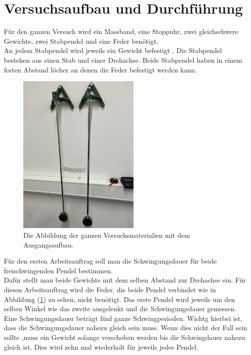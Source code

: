 \section{Versuchsaufbau und Durchführung}

\begin{flushleft}
    Für den ganzen Versuch wird ein Massband, eine Stoppuhr, zwei gleichschwere Gewichte, zwei Stabpendel und eine Feder benötigt.\\
    An jedem Stabpendel wird jeweils ein Gewicht befestigt . 
    Die Stabpendel bestehen aus einen Stab und einer Drehachse. 
    Beide Stabpendel haben in einem festen Abstand  löcher an denen die Feder befestigt werden kann.
\end{flushleft}

\begin{figure}
    \centering
    \includegraphics[height=80mm]{bilder/aufbau.jpeg}
    \caption{Die Abbildung der ganzen Versuchsmaterialien mit dem Ausgangsaufbau.\label{Abbildung2} }
\end{figure} 

\begin{flushleft}
    Für den ersten Arbeitsauftrag soll man die Schwingungsdauer für beide freischwingenden Pendel bestimmen. \\
    Dafür stellt man beide Gewichte mit dem selben Abstand zur Drehachse ein.
    Für diesen Arbeitsauftrag wird die Feder, die beide Pendel verbindet wie in Abbildung (\ref{Abbildung2}) zu sehen, nicht benötigt.
    Das erste Pendel wird jeweils um den selben Winkel wie das zweite ausgelenkt und die Schwingungsdauer gemessen.
    Eine Schwingungsdauer beträgt fünf ganze Schwingperioden. 
    Wichtg hierbei ist, dass die Schwingungsdauer nahezu gleich sein muss.
    Wenn dies nicht der Fall sein sollte ,muss ein Gewicht solange verschoben werden bis die Schwingdauer nahezu gleich ist.
    Dies wird zehn mal wiederholt für jeweils jedes Pendel.
\end{flushleft}

